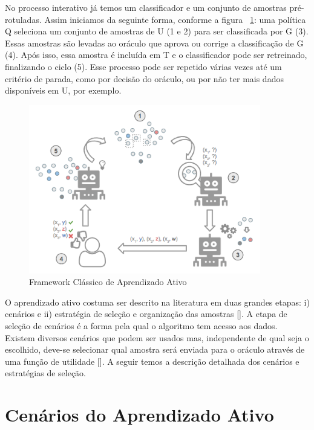 No processo interativo já temos um classificador e um conjunto de amostras pré-rotuladas. Assim iniciamos da seguinte forma, conforme a figura ~\ref{fig:framework_AL_classico}: uma política Q seleciona um conjunto de amostras de U (1 e 2) para ser classificada por G (3). Essas amostras são levadas ao oráculo que aprova ou corrige a classificação de G (4). Após isso, essa amostra é incluída em T e o classificador pode ser retreinado, finalizando o ciclo (5). Esse processo pode ser repetido várias vezes até um critério de parada, como por decisão do oráculo, ou por não ter mais dados disponíveis em U, por exemplo. 


\begin{figure}
  \centering
  \includegraphics[width=0.9\textwidth]{figures/Framework_Active_Learning_Classico_v2.png}
  \caption{Framework Clássico de Aprendizado Ativo}
  \label{fig:framework_AL_classico}
\end{figure}


O aprendizado ativo costuma ser descrito na literatura em duas grandes etapas: i) cenários e ii) estratégia de seleção e organização das amostras [\cite{settles2014active}]. A etapa de seleção de cenários é a forma pela qual o algoritmo tem acesso aos dados. Existem diversos cenários que podem ser usados mas, independente de qual seja o escolhido, deve-se selecionar qual amostra será enviada para o oráculo através de uma função de utilidade [\cite{olsson2009literature, dasgupta2011two}]. A seguir temos a descrição detalhada dos cenários e estratégias de seleção. 


\section{Cenários do Aprendizado Ativo}
\label{sec:cenarios}

